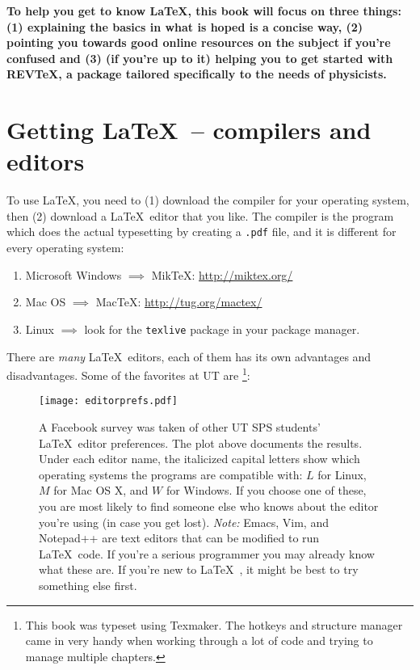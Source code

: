 {\bf To help you get to know \LaTeX , this book will focus on three things: (1) explaining the basics in what is hoped is a concise way, (2) pointing you towards good online resources on the subject if you're confused and (3) (if you're up to it) helping you to get started with REV\TeX , a package tailored specifically to the needs of physicists.}

\section{Getting \LaTeX\ -- compilers and editors}

To use \LaTeX, you need to (1) download the compiler for your operating system, then (2) download a \LaTeX\ editor that you like. The compiler is the program which does the actual typesetting by creating a \texttt{.pdf} file, and it is different for every operating system:\\
\begin{enumerate}
\item Microsoft Windows $\implies$ MikTeX: \url{http://miktex.org/}
\item Mac OS $\implies$ MacTeX: \url{http://tug.org/mactex/}
\item Linux $\implies$ look for the \texttt{texlive} package in your package manager.\\
\end{enumerate}
There are \emph{many} \LaTeX\ editors, each of them has its own advantages and disadvantages. Some of the favorites at UT are \footnote{This book was typeset using Texmaker. The hotkeys and structure manager came in very handy when working through a lot of code and trying to manage multiple chapters.}:
\begin{figure}[h]
\centering
\texttt{[image: editorprefs.pdf]}
\caption{A Facebook survey was taken of other UT SPS students' \LaTeX\ editor preferences. The plot above documents the results. Under each editor name, the italicized capital letters show which operating systems the programs are compatible with:  $L$ for Linux, $M$ for Mac OS X, and $W$ for Windows. If you choose one of these, you are most likely to find someone else who knows about the editor you're using (in case you get lost). \emph{Note:} Emacs, Vim, and Notepad++ are text editors that can be modified to run \LaTeX\ code. If you're a serious programmer you may already know what these are. If you're new to \LaTeX\ , it might be best to try something else first.}
\end{figure}

